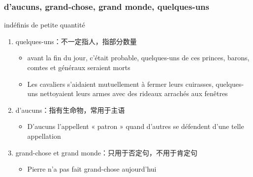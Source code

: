 \documentclass[UTF8]{report}
\begin{document}
\subsubsection{d’aucuns, grand-chose, grand monde, quelques-uns}
indéfinis de petite quantité
\begin{enumerate}
    \item quelques-uns：不一定指人，指部分数量
    \begin{itemize}
        \item avant la fin du jour, c’était probable, quelques-uns de ces princes, barons, comtes et généraux seraient morts
        \item Les cavaliers s’aidaient mutuellement à fermer leurs cuirasses, quelques-uns nettoyaient leurs armes avec des rideaux arrachés aux fenêtres
    \end{itemize}
    \item d’aucuns：指有生命物，常用于主语
    \begin{itemize}
        \item D’aucuns l’appellent « patron » quand d’autres se défendent d’une telle appellation
    \end{itemize}
    \item grand-chose et grand monde：只用于否定句，不用于肯定句
    \begin{itemize}
        \item Pierre n’a pas fait grand-chose aujourd’hui
    \end{itemize}
\end{enumerate}
\end{document}

